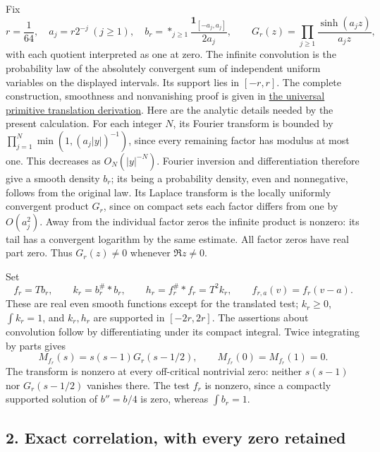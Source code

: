 \documentclass[
  10pt,
  a4paper,
]{article}
\begin{document}
Fix \[
 r=\frac1{64},\quad a_j=r2^{-j}\ (j\ge1),\quad
 b_r=\mathop{*}_{j\ge1}\frac{\mathbf1_{[-a_j,a_j]}}{2a_j},\qquad
 G_r(z)=\prod_{j\ge1}\frac{\sinh(a_jz)}{a_jz},
\tag{PW3}
\] with each quotient interpreted as one at zero. The infinite
convolution is the probability law of the absolutely convergent sum of
independent uniform variables on the displayed intervals. Its support
lies in \([-r,r]\). The complete construction, smoothness and
nonvanishing proof is given in
\href{UNIVERSAL_PRIMITIVE_TRANSLATION_CRITERION.md}{the universal
primitive translation derivation}. Here are the analytic details needed
by the present calculation. For each integer \(N\), its Fourier
transform is bounded by \(\prod_{j=1}^{N}\min(1,(a_j|y|)^{-1})\), since
every remaining factor has modulus at most one. This decreases as
\(O_N(|y|^{-N})\). Fourier inversion and differentiation therefore give
a smooth density \(b_r\); its being a probability density, even and
nonnegative, follows from the original law. Its Laplace transform is the
locally uniformly convergent product \(G_r\), since on compact sets each
factor differs from one by \(O(a_j^2)\). Away from the individual factor
zeros the infinite product is nonzero: its tail has a convergent
logarithm by the same estimate. All factor zeros have real part zero.
Thus \(G_r(z)\ne0\) whenever \(\Re z\ne0\).

Set \[
 f_r=Tb_r,\qquad k_r=b_r^\#*b_r,\qquad h_r=f_r^\#*f_r=T^2k_r,
\qquad f_{r,a}(v)=f_r(v-a).
\tag{PW4}
\] These are real even smooth functions except for the translated test;
\(k_r\ge0\), \(\int k_r=1\), and \(k_r,h_r\) are supported in
\([-2r,2r]\). The assertions about convolution follow by differentiating
under its compact integral. Twice integrating by parts gives \[
 M_{f_r}(s)=s(s-1)G_r(s-1/2),\qquad M_{f_r}(0)=M_{f_r}(1)=0.
\tag{PW5}
\] The transform is nonzero at every off-critical nontrivial zero:
neither \(s(s-1)\) nor \(G_r(s-1/2)\) vanishes there. The test \(f_r\)
is nonzero, since a compactly supported solution of \(b''=b/4\) is zero,
whereas \(\int b_r=1\).

\subsection{2. Exact correlation, with every zero
retained}\label{exact-correlation-with-every-zero-retained}
\end{document}
